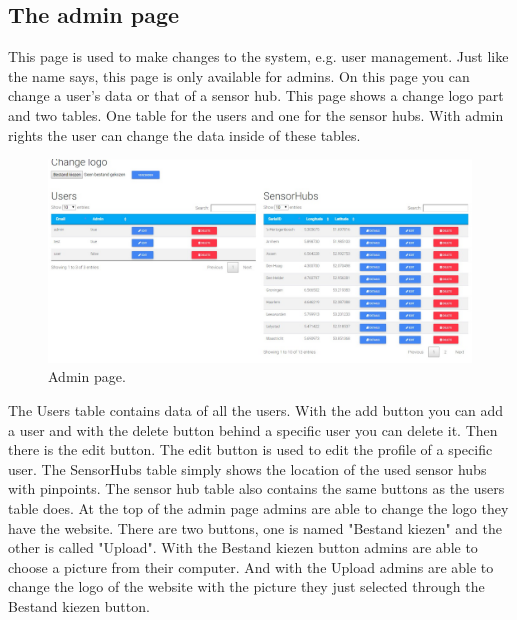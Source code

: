 \documentclass[a4paper]{article}
\begin{document}
\subsection{The admin page}
This page is used to make changes to the system, e.g. user management. Just like the name says, this page is only available for admins. On this page you can change a user's data or that of a sensor hub.
\newline
\newline
This page shows a change logo part and two tables. One table for the users and one for the sensor hubs. With admin rights the user can change the data inside of these tables.
\begin{figure}[h!]
  \caption{Admin page.}
  \centering
  \includegraphics[width=1\textwidth]{admin}
\end{figure}
\newline
\newline
The Users table contains data of all the users. With the add button you can add a user and with the delete button behind a specific user you can delete it. Then there is the edit button. The edit button is used to edit the profile of a specific user.
\newline
\newline
The SensorHubs table simply shows the location of the used sensor hubs with pinpoints. The sensor hub table also contains the same buttons as the users table does.
\newline
\newline
At the top of the admin page admins are able to change the logo they have the website. There are two buttons, one is named "Bestand kiezen" and the other is called "Upload". With the Bestand kiezen button admins are able to choose a picture from their computer. And with the Upload admins are able to change the logo of the website with the picture they just selected through the Bestand kiezen button.
\newline
\end{document}
